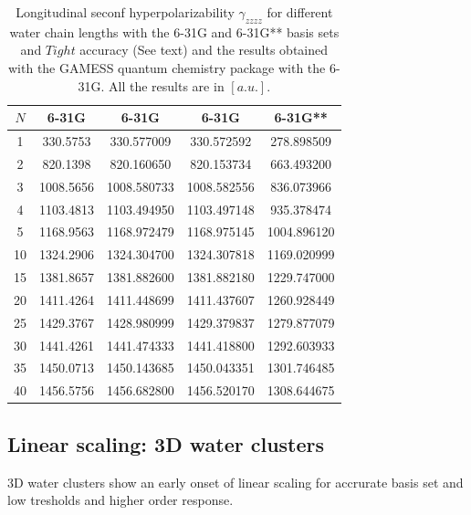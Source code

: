 \documentclass[twocolumn,showpacs,preprintnumbers,amsmath,amssymb]{revtex4}
\begin{document}
\begin{table}
  \centering
  \caption{\protect
    Longitudinal seconf hyperpolarizability $\gamma_{zzzz}$
    for different water chain lengths with the 6-31G and 6-31G** basis sets
    and $Tight$ accuracy (See text) and the results obtained with
    the GAMESS quantum chemistry package \cite{gamess} with the 6-31G. 
    All the results are in $[a.u.]$.
  }\label{tab:Gamma_1D_Values}
  \begin{ruledtabular}
    \begin{tabular}{ccccc}
      $N$ &\multicolumn{1}{c}{6-31G\footnotemark[1]}
      &\multicolumn{1}{c}{6-31G\footnotemark[2]}
      &\multicolumn{1}{c}{6-31G\footnotemark[2]\footnotemark[3]}
      &\multicolumn{1}{c}{6-31G**\footnotemark[2]}\\
      \hline
      1 &  330.5753 &  330.577009 &  330.572592 &  278.898509 \\
      2 &  820.1398 &  820.160650 &  820.153734 &  663.493200 \\
      3 & 1008.5656 & 1008.580733 & 1008.582556 &  836.073966 \\
      4 & 1103.4813 & 1103.494950 & 1103.497148 &  935.378474 \\
      5 & 1168.9563 & 1168.972479 & 1168.975145 & 1004.896120 \\
     10 & 1324.2906 & 1324.304700 & 1324.307818 & 1169.020999 \\
     15 & 1381.8657 & 1381.882600 & 1381.882180 & 1229.747000 \\
     20 & 1411.4264 & 1411.448699 & 1411.437607 & 1260.928449 \\
     25 & 1429.3767 & 1428.980999 & 1429.379837 & 1279.877079 \\
     30 & 1441.4261 & 1441.474333 & 1441.418800 & 1292.603933 \\
     35 & 1450.0713 & 1450.143685 & 1450.043351 & 1301.746485 \\
     40 & 1456.5756 & 1456.682800 & 1456.520170 & 1308.644675 \\
    \end{tabular}
  \end{ruledtabular}
\end{table}


\subsection{Linear scaling: 3D water clusters}
3D water clusters show an early onset of linear scaling for accrurate
basis set and low tresholds and higher order response.
\end{document}
